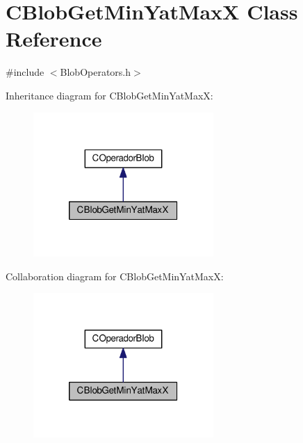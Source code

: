 \hypertarget{classCBlobGetMinYatMaxX}{\section{C\-Blob\-Get\-Min\-Yat\-Max\-X Class Reference}
\label{classCBlobGetMinYatMaxX}
}


{\ttfamily \#include $<$Blob\-Operators.\-h$>$}



Inheritance diagram for C\-Blob\-Get\-Min\-Yat\-Max\-X\-:\nopagebreak
\begin{figure}[H]
\begin{center}
\leavevmode
\includegraphics[width=194pt]{classCBlobGetMinYatMaxX__inherit__graph}
\end{center}
\end{figure}


Collaboration diagram for C\-Blob\-Get\-Min\-Yat\-Max\-X\-:\nopagebreak
\begin{figure}[H]
\begin{center}
\leavevmode
\includegraphics[width=194pt]{classCBlobGetMinYatMaxX__coll__graph}
\end{center}
\end{figure}
